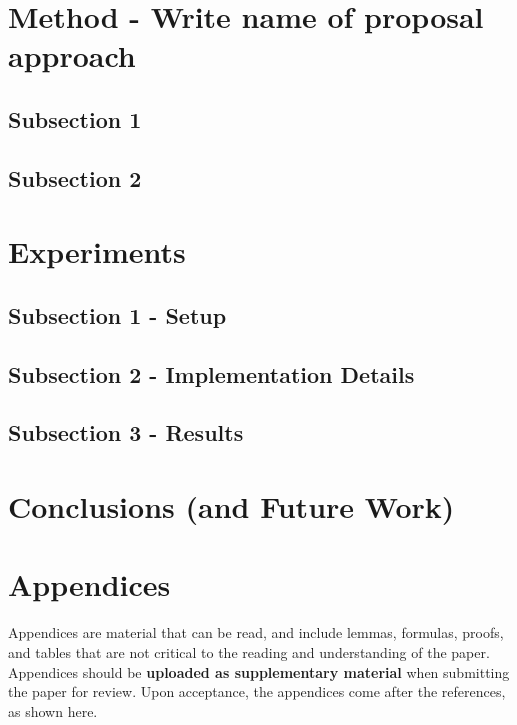 \documentclass[10pt,twocolumn,letterpaper]{article}
\begin{document}
\section{Method - Write name of proposal approach}
\label{sec:method}
\subsection{Subsection 1}
\subsection{Subsection 2}

\section{Experiments}
\label{sec:experiments}
\subsection{Subsection 1 - Setup}
\subsection{Subsection 2 - Implementation Details}
\subsection{Subsection 3 - Results}

\section{Conclusions (and Future Work)}
\label{sec:conclusions}

\appendix
\section{Appendices}
\label{sec:appendix}
Appendices are material that can be read, and include lemmas, formulas, proofs, and tables that are not critical to the reading and understanding of the paper. 
Appendices should be \textbf{uploaded as supplementary material} when submitting the paper for review.
Upon acceptance, the appendices come after the references, as shown here.
\end{document}
